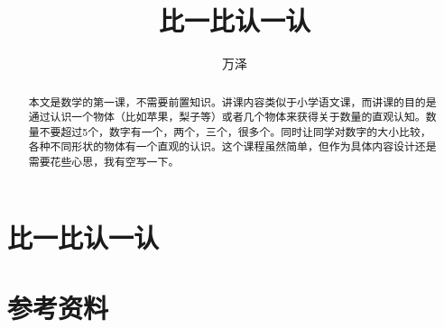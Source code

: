 \documentclass[12pt]{exam}%
\begin{document}
\begin{coverpages}
\title{比一比认一认}
\author{万泽}
\maketitle
\begin{abstract}
本文是数学的第一课，不需要前置知识。讲课内容类似于小学语文课，而讲课的目的是通过认识一个物体（比如苹果，梨子等）或者几个物体来获得关于数量的直观认知。数量不要超过5个，数字有一个，两个，三个，很多个。同时让同学对数字的大小比较，各种不同形状的物体有一个直观的认识。这个课程虽然简单，但作为具体内容设计还是需要花些心思，我有空写一下。
\end{abstract}
\tableofcontents
\end{coverpages}


\section{比一比认一认}




\section{参考资料}
\end{document}
